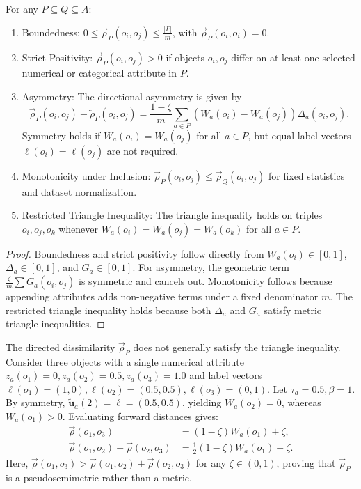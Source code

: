 \begin{proposition}
	\label{prop:relative-directed-properties}
	For any $P \subseteq Q \subseteq A$:
	\begin{enumerate}
		\item Boundedness: $0 \le \overrightarrow{\rho}_P(o_i, o_j) \le \frac{|P|}{m}$, with $\overrightarrow{\rho}_P(o_i, o_i) = 0$.
		\item Strict Positivity: $\overrightarrow{\rho}_P(o_i, o_j) > 0$ if objects $o_i, o_j$ differ on at least one selected numerical or categorical attribute in $P$.
		\item Asymmetry: The directional asymmetry is given by
		\[
		\overrightarrow{\rho}_P(o_i, o_j) - \overleftarrow{\rho}_P(o_i, o_j) = \frac{1-\zeta}{m} \sum_{a \in P} \left( W_a(o_i) - W_a(o_j) \right) \Delta_a(o_i, o_j).
		\]
		Symmetry holds if $W_a(o_i) = W_a(o_j)$ for all $a \in P$, but equal label vectors $\boldsymbol{\ell}(o_i) = \boldsymbol{\ell}(o_j)$ are not required.
		\item Monotonicity under Inclusion: $\overrightarrow{\rho}_P(o_i, o_j) \le \overrightarrow{\rho}_Q(o_i, o_j)$ for fixed statistics and dataset normalization.
		\item Restricted Triangle Inequality: The triangle inequality holds on triples $o_i, o_j, o_k$ whenever $W_a(o_i) = W_a(o_j) = W_a(o_k)$ for all $a \in P$.
	\end{enumerate}
\end{proposition}
\begin{proof}
	Boundedness and strict positivity follow directly from $W_a(o_i) \in [0,1]$, $\Delta_a \in [0,1]$, and $G_a \in [0,1]$. For asymmetry, the geometric term $\frac{\zeta}{m}\sum G_a(o_i, o_j)$ is symmetric and cancels out. Monotonicity follows because appending attributes adds non-negative terms under a fixed denominator $m$. The restricted triangle inequality holds because both $\Delta_a$ and $G_a$ satisfy metric triangle inequalities.
\end{proof}

\begin{remark}
	\label{rem:triangle-failure}
	The directed dissimilarity $\overrightarrow{\rho}_P$ does not generally satisfy the triangle inequality. Consider three objects with a single numerical attribute $z_a(o_1)=0, z_a(o_2)=0.5, z_a(o_3)=1.0$ and label vectors $\boldsymbol{\ell}(o_1)=(1,0), \boldsymbol{\ell}(o_2)=(0.5,0.5), \boldsymbol{\ell}(o_3)=(0,1)$. Let $\tau_a=0.5, \beta=1$. By symmetry, $\widetilde{\boldsymbol{u}}_a(2) = \bar{\boldsymbol{\ell}} = (0.5,0.5)$, yielding $W_a(o_2)=0$, whereas $W_a(o_1) > 0$. Evaluating forward distances gives:
	\begin{align*}
		\overrightarrow{\rho}(o_1, o_3) &= (1-\zeta) W_a(o_1) + \zeta, \\
		\overrightarrow{\rho}(o_1, o_2) + \overrightarrow{\rho}(o_2, o_3) &= \frac{1}{2}(1-\zeta) W_a(o_1) + \zeta.
	\end{align*}
	Here, $\overrightarrow{\rho}(o_1, o_3) > \overrightarrow{\rho}(o_1, o_2) + \overrightarrow{\rho}(o_2, o_3)$ for any $\zeta \in (0,1)$, proving that $\overrightarrow{\rho}_P$ is a pseudosemimetric rather than a metric.
\end{remark}